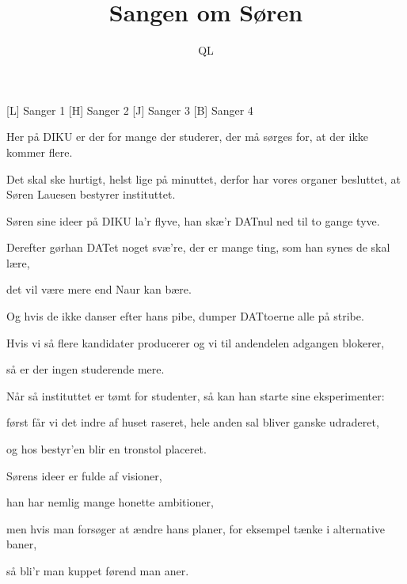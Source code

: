 \documentclass[a4paper,11pt]{article}
\title{Sangen om Søren}
\author{QL}
\begin{document}
\maketitle

\begin{roles}
[L] Sanger 1
[H] Sanger 2
[J] Sanger 3
[B] Sanger 4
\end{roles}

\begin{song}



%
Her på DIKU er der for mange der studerer,
der må sørges for, at der ikke kommer flere.

%
Det skal ske hurtigt, helst lige på minuttet,
derfor har vores organer besluttet,
at Søren Lauesen bestyrer instituttet. 

%
Søren sine ideer på DIKU la'r flyve,
han skæ'r DATnul ned til to gange tyve.

%
Derefter gørhan DATet noget svæ're,
der er mange ting, som han synes de skal lære,

%
det vil være mere end Naur kan bære.

%
Og hvis de ikke danser efter hans pibe,
dumper DATtoerne alle på stribe.

%
Hvis vi så flere kandidater producerer
og vi til andendelen adgangen blokerer,

%
så er der ingen studerende mere.

%
Når så instituttet er tømt for studenter,
så kan han starte sine eksperimenter:

%
først får vi det indre af huset raseret,
hele anden sal bliver ganske udraderet,

%
og hos bestyr'en blir en tronstol placeret.

%
Sørens ideer er fulde af visioner,

%
han har nemlig mange honette ambitioner,

%
men hvis man forsøger at ændre hans planer,
for eksempel tænke i alternative baner,

%
så bli'r man kuppet førend man aner.
\end{song}
\end{document}

